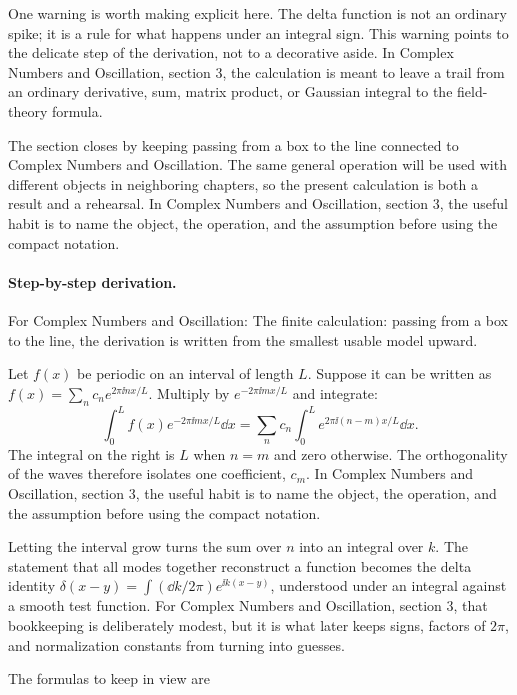One warning is worth making explicit here.  The delta function is not an ordinary spike; it is a rule for what happens under an integral sign.  This warning points to the delicate step of the derivation, not to a decorative aside.  In Complex Numbers and Oscillation, section 3, the calculation is meant to leave a trail from an ordinary derivative, sum, matrix product, or Gaussian integral to the field-theory formula.

The section closes by keeping passing from a box to the line connected to Complex Numbers and Oscillation.  The same general operation will be used with different objects in neighboring chapters, so the present calculation is both a result and a rehearsal.  In Complex Numbers and Oscillation, section 3, the useful habit is to name the object, the operation, and the assumption before using the compact notation.



\paragraph{Step-by-step derivation.}

For Complex Numbers and Oscillation: The finite calculation: passing from a box to the line, the derivation is written from the smallest usable model upward.

Let \(f(x)\) be periodic on an interval of length \(L\).  Suppose it can be written as \(f(x)=\sum_n c_ne^{2\pi\ii nx/L}\).  Multiply by \(e^{-2\pi\ii mx/L}\) and integrate:
\[
  \int_0^L f(x)e^{-2\pi\ii mx/L}\dd x
  =
  \sum_n c_n\int_0^L e^{2\pi\ii(n-m)x/L}\dd x.
\]
The integral on the right is \(L\) when \(n=m\) and zero otherwise.  The orthogonality of the waves therefore isolates one coefficient, \(c_m\).  In Complex Numbers and Oscillation, section 3, the useful habit is to name the object, the operation, and the assumption before using the compact notation.

Letting the interval grow turns the sum over \(n\) into an integral over \(k\).  The statement that all modes together reconstruct a function becomes the delta identity \(\delta(x-y)=\int(\dd k/2\pi)e^{\ii k(x-y)}\), understood under an integral against a smooth test function.  For Complex Numbers and Oscillation, section 3, that bookkeeping is deliberately modest, but it is what later keeps signs, factors of \(2\pi\), and normalization constants from turning into guesses.

The formulas to keep in view are


